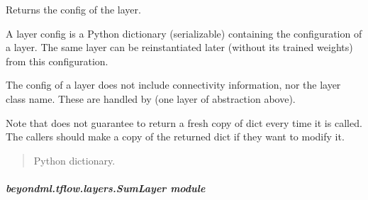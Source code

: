 \documentclass[letterpaper,10pt,english]{sphinxmanual}
\begin{document}
\begin{fulllineitems}
\begin{fulllineitems}
\end{fulllineitems}


\begin{fulllineitems}
\label{\detokenize{beyondml.tflow.layers:beyondml.tflow.layers.SparseMultiDense.SparseMultiDense.get_config}}
\pysigstartsignatures
{}
\pysigstopsignatures
\sphinxAtStartPar
Returns the config of the layer.

\sphinxAtStartPar
A layer config is a Python dictionary (serializable)
containing the configuration of a layer.
The same layer can be reinstantiated later
(without its trained weights) from this configuration.

\sphinxAtStartPar
The config of a layer does not include connectivity
information, nor the layer class name. These are handled
by  (one layer of abstraction above).

\sphinxAtStartPar
Note that  does not guarantee to return a fresh copy of
dict every time it is called. The callers should make a copy of the
returned dict if they want to modify it.
\begin{quote}\begin{description}
\sphinxAtStartPar
Python dictionary.

\end{description}\end{quote}

\end{fulllineitems}


\end{fulllineitems}



\subparagraph{beyondml.tflow.layers.SumLayer module}
\label{\detokenize{beyondml.tflow.layers:module-beyondml.tflow.layers.SumLayer}}\label{\detokenize{beyondml.tflow.layers:beyondml-tflow-layers-sumlayer-module}}
\end{document}
